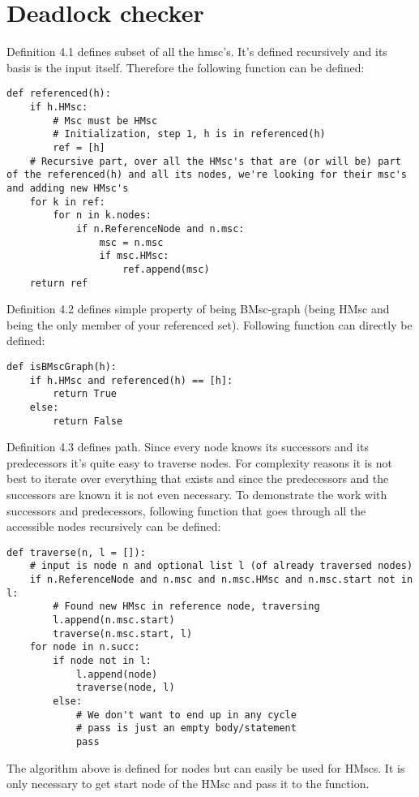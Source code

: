 \documentclass[11pt,oneside]{fithesis2}
\begin{document}
\section{Deadlock checker}
Definition 4.1 defines subset of all the hmsc's. It's defined recursively and its basis is the input itself. Therefore the following function can be defined:
\begin{lstlisting}
def referenced(h):
    if h.HMsc:
        # Msc must be HMsc
        # Initialization, step 1, h is in referenced(h)
        ref = [h]
    # Recursive part, over all the HMsc's that are (or will be) part of the referenced(h) and all its nodes, we're looking for their msc's and adding new HMsc's
    for k in ref:
        for n in k.nodes:
            if n.ReferenceNode and n.msc:
                msc = n.msc
                if msc.HMsc:
                    ref.append(msc)
    return ref
\end{lstlisting}
Definition 4.2 defines simple property of being BMsc-graph (being HMsc and being the only member of your referenced set). Following function can directly be defined:
\begin{lstlisting}
def isBMscGraph(h):
    if h.HMsc and referenced(h) == [h]:
        return True
    else:
        return False
\end{lstlisting}
Definition 4.3 defines path. Since every node knows its successors and its predecessors it's quite easy to traverse nodes. For complexity reasons it is not best to iterate over everything that exists and since the predecessors and the successors are known it is not even necessary. To demonstrate the work with successors and predecessors, following function that goes through all the accessible nodes recursively can be defined:
\begin{lstlisting}
def traverse(n, l = []):
    # input is node n and optional list l (of already traversed nodes)
    if n.ReferenceNode and n.msc and n.msc.HMsc and n.msc.start not in l:
        # Found new HMsc in reference node, traversing
        l.append(n.msc.start)
        traverse(n.msc.start, l)
    for node in n.succ:
        if node not in l:
            l.append(node)
            traverse(node, l)
        else:
            # We don't want to end up in any cycle
            # pass is just an empty body/statement
            pass
\end{lstlisting}
The algorithm above is defined for nodes but can easily be used for HMscs. It is only necessary to get start node of the HMsc and pass it to the function.
\end{document}
